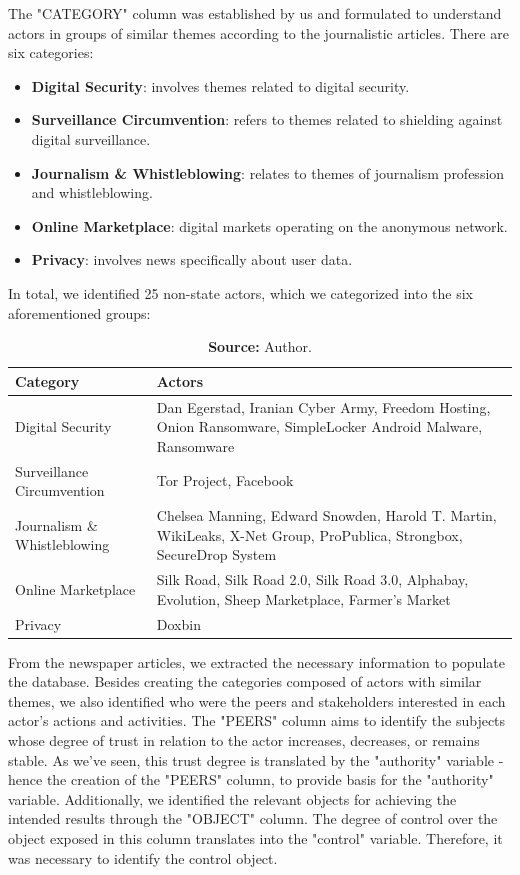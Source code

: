 The "CATEGORY" column was established by us and formulated to understand actors in groups of similar themes according to the journalistic articles. There are six categories:

\begin{itemize}
    \item \textbf{Digital Security}: involves themes related to digital security.
    \item \textbf{Surveillance Circumvention}: refers to themes related to shielding against digital surveillance.
    \item \textbf{Journalism \& Whistleblowing}: relates to themes of journalism profession and whistleblowing.
    \item \textbf{Online Marketplace}: digital markets operating on the anonymous network.
    \item \textbf{Privacy}: involves news specifically about user data.
\end{itemize}

In total, we identified 25 non-state actors, which we categorized into the six aforementioned groups:

\begin{table}[ht]
    \centering
    \caption{Non-state Actors by Category}
    \label{tab:actors_by_category}
    \begin{tabular}{lp{8cm}}
        \toprule
        \textbf{Category} & \textbf{Actors} \\
        \midrule
        Digital Security & Dan Egerstad, Iranian Cyber Army, Freedom Hosting, Onion Ransomware, SimpleLocker Android Malware, Ransomware \\
        Surveillance Circumvention & Tor Project, Facebook \\
        Journalism \& Whistleblowing & Chelsea Manning, Edward Snowden, Harold T. Martin, WikiLeaks, X-Net Group, ProPublica, Strongbox, SecureDrop System \\
        Online Marketplace & Silk Road, Silk Road 2.0, Silk Road 3.0, Alphabay, Evolution, Sheep Marketplace, Farmer's Market \\
        Privacy & Doxbin \\
        \bottomrule
    \end{tabular}
    \caption*{\textbf{Source:} Author.}
\end{table}

From the newspaper articles, we extracted the necessary information to populate the database. Besides creating the categories composed of actors with similar themes, we also identified who were the peers and stakeholders interested in each actor's actions and activities. The "PEERS" column aims to identify the subjects whose degree of trust in relation to the actor increases, decreases, or remains stable. As we've seen, this trust degree is translated by the "authority" variable - hence the creation of the "PEERS" column, to provide basis for the "authority" variable. Additionally, we identified the relevant objects for achieving the intended results through the "OBJECT" column. The degree of control over the object exposed in this column translates into the "control" variable. Therefore, it was necessary to identify the control object.

